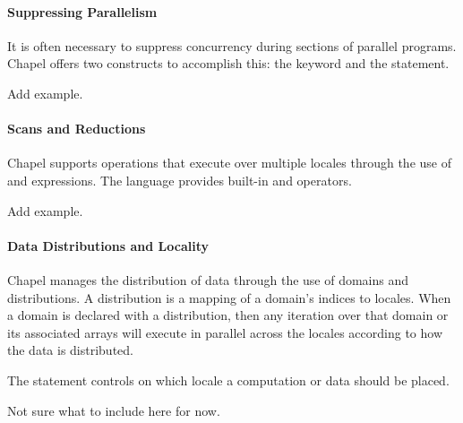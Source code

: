 \paragraph{Suppressing Parallelism}
It is often necessary to suppress concurrency during sections of
parallel programs.  Chapel offers two constructs to accomplish this:
the  keyword and the  statement.

\begin{TODO}
Add example.
\end{TODO}

\paragraph{Scans and Reductions}
Chapel supports operations that execute over multiple locales through
the use of  and  expressions.  The language
provides built-in  and  operators. 

\begin{TODO}
Add example.
\end{TODO}

\paragraph{Data Distributions and Locality}
Chapel manages the distribution of data through the use of domains
and distributions.  A distribution is a mapping of a domain's indices to 
locales.  When a domain is declared with a distribution, then any iteration
over that domain or its associated arrays will execute in parallel across the 
locales according to how the data is distributed.

The  statement controls on which locale a computation or data
should be placed.

\begin{TODO}
Not sure what to include here for now.  
\end{TODO}

